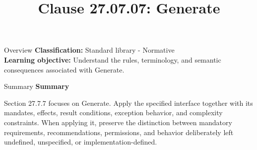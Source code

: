 \documentclass[10pt,letterpaper]{article}
\title{Clause 27.07.07: Generate}
\author{}
\date{}
\begin{document}
\maketitle
\begin{CornellOverviewBox}{Overview}
\textbf{Classification:} Standard library - Normative\\[2pt]
\textbf{Learning objective:} Understand the rules, terminology, and semantic consequences associated with Generate.
\end{CornellOverviewBox}\begin{CornellSummaryBox}{Summary}
{\sffamily\bfseries\color{Accent} Summary}\par\vspace{3pt}Section 27.7.7 focuses on Generate. Apply the specified interface together with its mandates, effects, result conditions, exception behavior, and complexity constraints. When applying it, preserve the distinction between mandatory requirements, recommendations, permissions, and behavior deliberately left undefined, unspecified, or implementation-defined.
\end{CornellSummaryBox}
\end{document}
